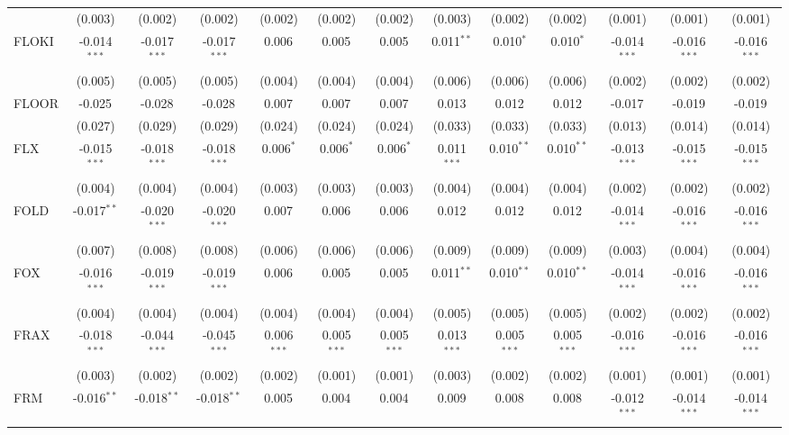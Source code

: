 \begin{table}[!htbp]
\begin{tabular}{@{\extracolsep{5pt}}lcccccccccccc}
  & (0.003) & (0.002) & (0.002) & (0.002) & (0.002) & (0.002) & (0.003) & (0.002) & (0.002) & (0.001) & (0.001) & (0.001) \\
 FLOKI & -0.014$^{***}$ & -0.017$^{***}$ & -0.017$^{***}$ & 0.006$^{}$ & 0.005$^{}$ & 0.005$^{}$ & 0.011$^{**}$ & 0.010$^{*}$ & 0.010$^{*}$ & -0.014$^{***}$ & -0.016$^{***}$ & -0.016$^{***}$ \\
  & (0.005) & (0.005) & (0.005) & (0.004) & (0.004) & (0.004) & (0.006) & (0.006) & (0.006) & (0.002) & (0.002) & (0.002) \\
 FLOOR & -0.025$^{}$ & -0.028$^{}$ & -0.028$^{}$ & 0.007$^{}$ & 0.007$^{}$ & 0.007$^{}$ & 0.013$^{}$ & 0.012$^{}$ & 0.012$^{}$ & -0.017$^{}$ & -0.019$^{}$ & -0.019$^{}$ \\
  & (0.027) & (0.029) & (0.029) & (0.024) & (0.024) & (0.024) & (0.033) & (0.033) & (0.033) & (0.013) & (0.014) & (0.014) \\
 FLX & -0.015$^{***}$ & -0.018$^{***}$ & -0.018$^{***}$ & 0.006$^{*}$ & 0.006$^{*}$ & 0.006$^{*}$ & 0.011$^{***}$ & 0.010$^{**}$ & 0.010$^{**}$ & -0.013$^{***}$ & -0.015$^{***}$ & -0.015$^{***}$ \\
  & (0.004) & (0.004) & (0.004) & (0.003) & (0.003) & (0.003) & (0.004) & (0.004) & (0.004) & (0.002) & (0.002) & (0.002) \\
 FOLD & -0.017$^{**}$ & -0.020$^{***}$ & -0.020$^{***}$ & 0.007$^{}$ & 0.006$^{}$ & 0.006$^{}$ & 0.012$^{}$ & 0.012$^{}$ & 0.012$^{}$ & -0.014$^{***}$ & -0.016$^{***}$ & -0.016$^{***}$ \\
  & (0.007) & (0.008) & (0.008) & (0.006) & (0.006) & (0.006) & (0.009) & (0.009) & (0.009) & (0.003) & (0.004) & (0.004) \\
 FOX & -0.016$^{***}$ & -0.019$^{***}$ & -0.019$^{***}$ & 0.006$^{}$ & 0.005$^{}$ & 0.005$^{}$ & 0.011$^{**}$ & 0.010$^{**}$ & 0.010$^{**}$ & -0.014$^{***}$ & -0.016$^{***}$ & -0.016$^{***}$ \\
  & (0.004) & (0.004) & (0.004) & (0.004) & (0.004) & (0.004) & (0.005) & (0.005) & (0.005) & (0.002) & (0.002) & (0.002) \\
 FRAX & -0.018$^{***}$ & -0.044$^{***}$ & -0.045$^{***}$ & 0.006$^{***}$ & 0.005$^{***}$ & 0.005$^{***}$ & 0.013$^{***}$ & 0.005$^{***}$ & 0.005$^{***}$ & -0.016$^{***}$ & -0.016$^{***}$ & -0.016$^{***}$ \\
  & (0.003) & (0.002) & (0.002) & (0.002) & (0.001) & (0.001) & (0.003) & (0.002) & (0.002) & (0.001) & (0.001) & (0.001) \\
 FRM & -0.016$^{**}$ & -0.018$^{**}$ & -0.018$^{**}$ & 0.005$^{}$ & 0.004$^{}$ & 0.004$^{}$ & 0.009$^{}$ & 0.008$^{}$ & 0.008$^{}$ & -0.012$^{***}$ & -0.014$^{***}$ & -0.014$^{***}$ \\

\end{tabular}
\end{table}
